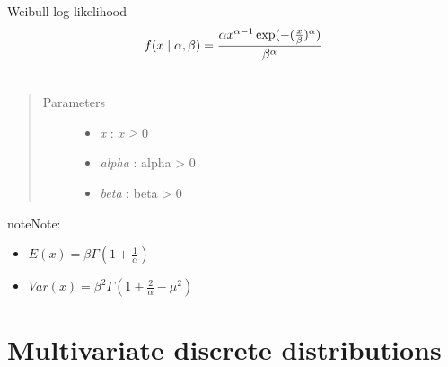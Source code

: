 \documentclass[letterpaper,10pt,english]{sphinxmanual}
\begin{document}
\begin{fulllineitems}
\label{distributions:pymc.distributions.weibull_like}
Weibull log-likelihood
\begin{gather}
\begin{split}f(x \mid \alpha, \beta) = \frac{\alpha x^{\alpha - 1}
\exp(-(\frac{x}{\beta})^{\alpha})}{\beta^\alpha}\end{split}\notag\\\begin{split}\end{split}\notag
\end{gather}\begin{quote}\begin{description}
\item[{Parameters }] \leavevmode\begin{itemize}
\item {} 
\emph{x} : $x \ge 0$

\item {} 
\emph{alpha} : alpha \textgreater{} 0

\item {} 
\emph{beta} : beta \textgreater{} 0

\end{itemize}

\end{description}\end{quote}

\begin{notice}{note}{Note:}\begin{itemize}
\item {} 
$E(x)=\beta \Gamma(1+\frac{1}{\alpha})$

\item {} 
$Var(x)=\beta^2 \Gamma(1+\frac{2}{\alpha} - \mu^2)$

\end{itemize}
\end{notice}

\end{fulllineitems}



\section{Multivariate discrete distributions}
\label{distributions:multivariate-discrete-distributions}
\end{document}
